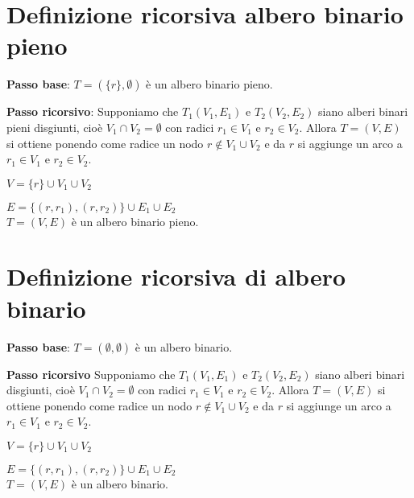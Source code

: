 \section{Definizione ricorsiva albero binario pieno}
\textbf{Passo base}: $T=(\{r\}, \emptyset)$ è un albero binario pieno.

\textbf{Passo ricorsivo}: Supponiamo che $T_1(V_1, E_1)$ e $T_2(V_2, E_2)$ siano alberi binari pieni  disgiunti, cioè $V_1 \cap V_2 = \emptyset$ con radici $r_1 \in V_1$ e $r_2 \in V_2$. 
Allora $T=(V, E)$ si ottiene ponendo come radice un nodo $r \not\in V_1 \cup V_2$ e da $r$ si aggiunge un arco a $r_1 \in V_1$ e $r_2 \in V_2$.

$V = \{r\} \cup V_1 \cup V_2$

$E = \{(r, r_1), (r, r_2)\} \cup E_1 \cup E_2$ \\
$T = (V, E)$ è un albero binario pieno.

\section{Definizione ricorsiva di albero binario}
\textbf{Passo base}: $T=(\emptyset, \emptyset)$ è un albero binario.

\textbf{Passo ricorsivo} Supponiamo che $T_1(V_1, E_1)$ e $T_2(V_2, E_2)$ siano alberi binari disgiunti, cioè $V_1 \cap V_2 = \emptyset$ con radici $r_1 \in V_1$ e $r_2 \in V_2$.
Allora $T=(V, E)$ si ottiene ponendo come radice un nodo $r \not\in V_1 \cup V_2$ e da $r$ si aggiunge un arco a $r_1 \in V_1$ e $r_2 \in V_2$.

$V = \{r\} \cup V_1 \cup V_2$

$E = \{(r, r_1), (r, r_2)\} \cup E_1 \cup E_2$ \\
$T = (V, E)$ è un albero binario.
